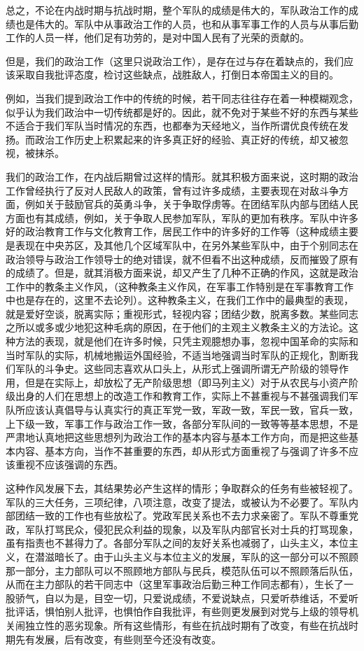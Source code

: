 总之，不论在内战时期与抗战时期，整个军队的成绩是伟大的，军队政治工作的成绩也是伟大的。军队中从事政治工作的人员，也和从事军事工作的人员与从事后勤工作的人员一样，他们足有功劳的，是对中国人民有了光荣的贡献的。

但是，我们的政治工作（这里只说政治工作），是存在过与存在着缺点的，我们应该采取自我批评态度，检讨这些缺点，战胜敌人，打倒日本帝国主义的目的。

例如，当我们提到政治工作中的传统的时候，若干同志往往存在着一种模糊观念，似乎认为我们政治中一切传统都是好的。因此，就不免对于某些不好的东西与某些不适合于我们军队当时情况的东西，也都奉为天经地义，当作所谓优良传统在发扬。而政治工作历史上积累起来的许多真正好的经验、真正好的传统，却又被忽视，被抹杀。

我们的政治工作，在内战后期曾过这样的情形。就其积极方面来说，这时期的政治工作曾经执行了反对人民敌人的政策，曾有过许多成绩，主要表现在对敌斗争方面，例如关于鼓励官兵的英勇斗争，关于争取俘虏等。在团结军队内部与团结人民方面也有其成绩，例如，关于争取人民参加军队，军队的更加有秩序。军队中许多好的政治教育工作与文化教育工作，居民工作中的许多好的工作等（这种成绩主要是表现在中央苏区，及其他几个区域军队中，在另外某些军队中，由于个别同志在政治领导与政治工作领导士的绝对错误，就不但看不出这种成绩，反而摧毁了原有的成绩了。但是，就其消极方面来说，却又产生了几种不正确的作风，这就是政治工作中的教条主义作风，（这种教条主义作风，在军事工作特别是在军事教育工作中也是存在的，这里不去论列）。这种教条主义，在我们工作中的最典型的表现，就是爱好空谈，脱离实际；重视形式，轻视内容；团结少数，脱离多数。某些同志之所以或多或少地犯这种毛病的原因，在于他们的主观主义教条主义的方法论。这种方法的表现，就是他们在许多时候，只凭主观臆想办事，忽视中国革命的实际和当时军队的实际，机械地搬运外国经验，不适当地强调当时军队的正规化，割断我们军队的斗争史。这些同志喜欢从口头上，从形式上强调所谓无产阶级的领导作用，但是在实际上，却放松了无产阶级思想（即马列主义）对于从农民与小资产阶级出身的人们在思想上的改造工作和教育工作，实际上不甚重视与不甚强调我们军队所应该认真倡导与认真实行的真正军党一致，军政一致，军民一致，官兵一致，上下级一致，军事工作与政治工作一致，各部分军队间的一致等等基本思想，不是严肃地认真地把这些思想列为政治工作的基本内容与基本工作方向，而是把这些基本内容、基本方向，当作不甚重要的东西，却从形式方面重视了与强调了许多不应该重视不应该强调的东西。

这种作风发展下去，其结果势必产生这样的情形；争取群众的任务有些被轻视了。军队的三大任务，三项纪律，八项注意，改变了提法，或被认为不必要了。军队内部团结一致的工作也有些放松了。党政军民关系也不去力求亲密了。军队不尊重党政，军队打骂民众，侵犯民众利益的现象，以及军队内部官长对士兵的打骂现象，虽有指责也不甚得力了。各部分军队之间的友好关系也减弱了，山头主义，本位主义，在潜滋暗长了。由于山头主义与本位主义的发展，军队的这一部分可以不照顾那一部分，主力部队可以不照顾地方部队与民兵，模范队伍可以不照顾落后队伍，从而在主力部队的若干同志中（这里军事政治后勤三种工作同志都有），生长了一股骄气，自以为是，目空一切，只爱说成绩，不爱说缺点，只爱听恭维话，不爱听批评话，惧怕别人批评，也惧怕作自我批评，有些则更发展到对党与上级的领导机关闹独立性的恶劣现象。所有这些情形，有些在抗战时期有了改变，有些在抗战时期先有发展，后有改变，有些则至今还没有改变。

